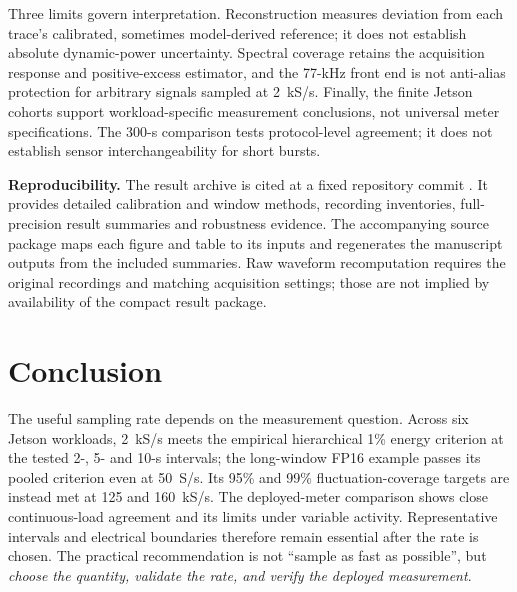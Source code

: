 \documentclass[a4paper,UKenglish,cleveref,autoref]{oasics-v2021}
\begin{document}
Three limits govern interpretation. Reconstruction measures deviation from each trace's calibrated, sometimes model-derived reference; it does not establish absolute dynamic-power uncertainty. Spectral coverage retains the acquisition response and positive-excess estimator, and the 77-kHz front end is not anti-alias protection for arbitrary signals sampled at 2~kS/s. Finally, the finite Jetson cohorts support workload-specific measurement conclusions, not universal meter specifications. The 300-s comparison tests protocol-level agreement; it does not establish sensor interchangeability for short bursts.

\medskip\noindent\textbf{Reproducibility.}
The result archive is cited at a fixed repository commit \cite{energyResults2026}. It provides detailed calibration and window methods, recording inventories, full-precision result summaries and robustness evidence. The accompanying source package maps each figure and table to its inputs and regenerates the manuscript outputs from the included summaries. Raw waveform recomputation requires the original recordings and matching acquisition settings; those are not implied by availability of the compact result package.

\section{Conclusion}
The useful sampling rate depends on the measurement question. Across six Jetson workloads, 2~kS/s meets the empirical hierarchical 1\% energy criterion at the tested 2-, 5- and 10-s intervals; the long-window FP16 example passes its pooled criterion even at 50~S/s. Its 95\% and 99\% fluctuation-coverage targets are instead met at 125 and 160~kS/s. The deployed-meter comparison shows close continuous-load agreement and its limits under variable activity. Representative intervals and electrical boundaries therefore remain essential after the rate is chosen. The practical recommendation is not ``sample as fast as possible'', but \emph{choose the quantity, validate the rate, and verify the deployed measurement}.

\FloatBarrier
\clearpage
\begingroup{}\endgroup
\end{document}
